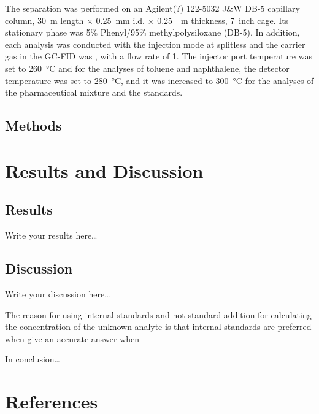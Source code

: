 \documentclass[a4paper, 12pt]{article}
\begin{document}
The separation was performed on an Agilent(?) 122-5032 J\&W DB-5 capillary column, \SI{30}{m} length $\times$ \SI{0.25}{mm} i.d. $\times$ \SI{0.25}{\mu{}m} thickness, \SI{7}{inch} cage. Its stationary phase was 5$\%$ Phenyl/95$\%$ methylpolysiloxane (DB-5). In addition, each analysis was conducted with the injection mode at splitless and the carrier gas in the GC-FID was , with a flow rate of \SI{1}{}. The injector port temperature was set to \SI{260}{\degreeCelsius} and for the analyses of toluene and naphthalene, the detector temperature was set to \SI{280}{\degreeCelsius}, and it was increased to \SI{300}{\degreeCelsius} for the analyses of the pharmaceutical mixture and the standards.

\subsection{Methods}



\section{Results and Discussion}

\subsection{Results}
Write your results here\ldots


\subsection{Discussion}
Write your discussion here\dots

The reason for using internal standards and not standard addition for calculating the concentration of the unknown analyte is that internal standards are preferred when give an accurate answer when 

In conclusion\dots


\section{References}
\printbibliography
\end{document}
